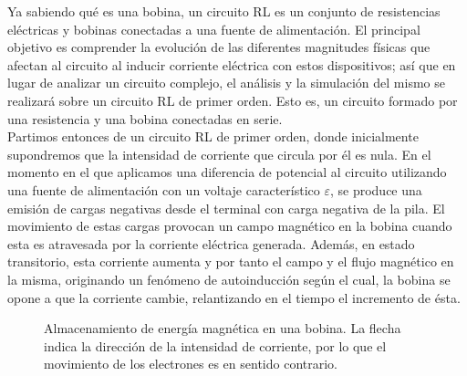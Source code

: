 \documentclass[../main.tex]{subfiles}
\begin{document}
Ya sabiendo qué es una bobina, un circuito RL es un conjunto de resistencias eléctricas y bobinas conectadas a una fuente de alimentación. El principal objetivo es comprender la evolución de las diferentes magnitudes físicas que afectan al circuito al inducir corriente eléctrica con estos dispositivos; así que en lugar de analizar un circuito complejo, el análisis y la simulación del mismo se realizará sobre un circuito RL de primer orden. Esto es, un circuito formado por una resistencia y una bobina conectadas en serie. \\

Partimos entonces de un circuito RL de primer orden, donde inicialmente supondremos que la intensidad de corriente que circula por él es nula. En el momento en el que aplicamos una diferencia de potencial al circuito utilizando una fuente de alimentación con un voltaje característico $\varepsilon$, se produce una emisión de cargas negativas desde el terminal con carga negativa de la pila. El movimiento de estas cargas provocan un campo magnético en la bobina cuando esta es atravesada por la corriente eléctrica generada. Además, en estado transitorio, esta corriente aumenta y por tanto el campo y el flujo magnético en la misma, originando un fenómeno de autoinducción según el cual, la bobina se opone a que la corriente cambie, relantizando en el tiempo el incremento de ésta. 

\begin{figure}[!h]
    \centering
    \caption{Almacenamiento de energía magnética en una bobina. La flecha indica la dirección de la intensidad de corriente, por lo que el movimiento de los electrones es en sentido contrario.}
    \label{fig::carga_bobina}
\end{figure}
\end{document}
